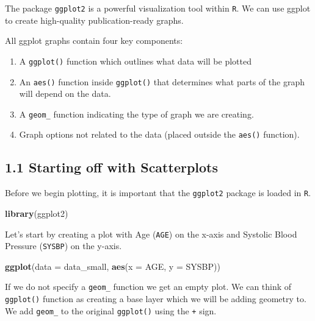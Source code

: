 \documentclass[
]{article}
\newenvironment{Shaded}{\begin{snugshade}}{\end{snugshade}}
\newcommand{\DataTypeTok}[1]{\textcolor[rgb]{0.13,0.29,0.53}{#1}}
\newcommand{\KeywordTok}[1]{\textcolor[rgb]{0.13,0.29,0.53}{\textbf{#1}}}
\newcommand{\NormalTok}[1]{#1}
\providecommand{\tightlist}{%
  \setlength{\itemsep}{0pt}\setlength{\parskip}{0pt}}
\begin{document}
The package \texttt{ggplot2} is a powerful visualization tool within
\texttt{R}. We can use ggplot to create high-quality publication-ready
graphs.

All ggplot graphs contain four key components:

\begin{enumerate}
\def\labelenumi{\arabic{enumi}.}
\tightlist
\item
  A \texttt{ggplot()} function which outlines what data will be plotted
\item
  An \texttt{aes()} function inside \texttt{ggplot()} that determines
  what parts of the graph will depend on the data.
\item
  A \texttt{geom\_} function indicating the type of graph we are
  creating.
\item
  Graph options not related to the data (placed outside the
  \texttt{aes()} function).
\end{enumerate}

\hypertarget{starting-off-with-scatterplots}{%
\subsection{1.1 Starting off with
Scatterplots}\label{starting-off-with-scatterplots}}

Before we begin plotting, it is important that the \texttt{ggplot2}
package is loaded in \texttt{R}.

\begin{Shaded}
\begin{Highlighting}[]
\KeywordTok{library}\NormalTok{(ggplot2)}
\end{Highlighting}
\end{Shaded}

Let's start by creating a plot with Age (\texttt{AGE}) on the x-axis and
Systolic Blood Pressure (\texttt{SYSBP}) on the y-axis.

\begin{Shaded}
\begin{Highlighting}[]
\KeywordTok{ggplot}\NormalTok{(}\DataTypeTok{data =}\NormalTok{ data_small, }
       \KeywordTok{aes}\NormalTok{(}\DataTypeTok{x =}\NormalTok{ AGE,}
           \DataTypeTok{y =}\NormalTok{ SYSBP)) }
\end{Highlighting}
\end{Shaded}

If we do not specify a \texttt{geom\_} function we get an empty plot. We
can think of \texttt{ggplot()} function as creating a base layer which
we will be adding geometry to. We add \texttt{geom\_} to the original
\texttt{ggplot()} using the \texttt{+} sign.
\end{document}
